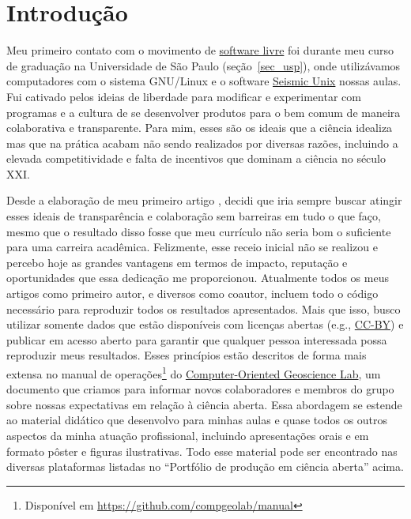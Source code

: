 \documentclass[10pt,a4paper,oneside]{book}
\begin{document}
\section{Introdução}

Meu primeiro contato com o movimento de \href{https://www.fsf.org/}{software livre}
foi durante meu curso de graduação na Universidade de São Paulo (seção~\ref{sec_usp}),
onde utilizávamos computadores com o sistema GNU/Linux e o software
\href{https://en.wikipedia.org/wiki/Seismic_Unix}{Seismic Unix} nossas aulas.
Fui cativado pelos ideias de liberdade para modificar e experimentar com
programas e a cultura de se desenvolver produtos para o bem comum de maneira
colaborativa e transparente.
Para mim, esses são os ideais que a ciência idealiza mas que na prática acabam
não sendo realizados por diversas razões, incluindo a elevada competitividade
e falta de incentivos que dominam a ciência no século XXI.

Desde a elaboração de meu primeiro artigo \citep{Uieda2012}, decidi que iria
sempre buscar atingir esses ideais de transparência e colaboração sem barreiras
em tudo o que faço, mesmo que o resultado disso fosse que meu currículo não
seria bom o suficiente para uma carreira acadêmica.
Felizmente, esse receio inicial não se realizou e percebo hoje as grandes
vantagens em termos de impacto, reputação e oportunidades que essa dedicação me
proporcionou.
Atualmente todos os meus artigos como primeiro autor, e diversos como coautor,
incluem todo o código necessário para reproduzir todos os resultados
apresentados.
Mais que isso, busco utilizar somente dados que estão disponíveis com
licenças abertas (e.g., \href{https://creativecommons.org/licenses/by/4.0/}{CC-BY})
e publicar em acesso aberto para garantir que qualquer pessoa interessada
possa reproduzir meus resultados.
Esses princípios estão descritos de forma mais extensa no manual de operações\footnote{Disponível
em \url{https://github.com/compgeolab/manual}}
do \href{https://www.compgeolab.org/}{Computer-Oriented Geoscience Lab},
um documento que criamos para informar novos colaboradores e membros
do grupo sobre nossas expectativas em relação à ciência aberta.
Essa abordagem se estende ao material didático que desenvolvo para minhas aulas
e quase todos os outros aspectos da minha atuação profissional, incluindo
apresentações orais e em formato pôster e figuras ilustrativas.
Todo esse material pode ser encontrado nas diversas plataformas listadas no
``Portfólio de produção em ciência aberta'' acima.
\end{document}
